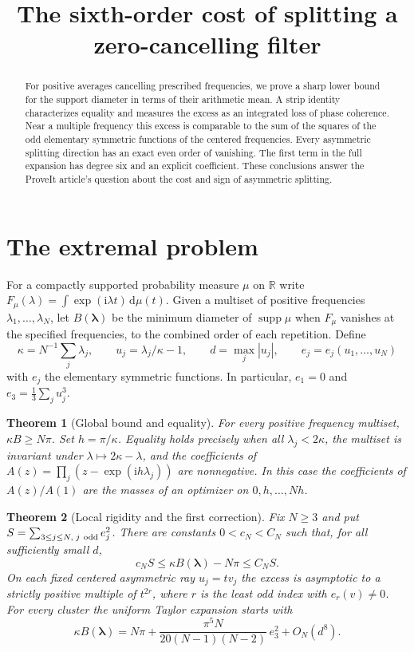 \documentclass[11pt]{article}
\title{The sixth-order cost of splitting a zero-cancelling filter}
\author{}
\date{}
\newtheorem{theorem}{Theorem}
\DeclareMathOperator{\supp}{supp}
\newcommand{\dd}{\mathrm d}
\newcommand{\ii}{\mathrm i}
\begin{document}
\maketitle
\begin{abstract}
For positive averages cancelling prescribed frequencies, we prove a sharp
lower bound for the support diameter in terms of their arithmetic mean.
A strip identity characterizes equality and measures the excess as an
integrated loss of phase coherence. Near a multiple frequency this excess
is comparable to the sum of the squares of the odd elementary symmetric
functions of the centered frequencies. Every asymmetric splitting direction
has an exact even order of vanishing. The first term in the full expansion
has degree six and an explicit coefficient. These conclusions answer the
ProveIt article's question about the cost and sign of asymmetric splitting.
\end{abstract}

\section{The extremal problem}
For a compactly supported probability measure $\mu$ on $\mathbb R$ write
$F_\mu(\lambda)=\int\exp(\ii\lambda t)\,\dd\mu(t)$.
Given a multiset of positive frequencies $\lambda_1,\dots,\lambda_N$, let
$B(\boldsymbol\lambda)$ be the minimum diameter of $\supp\mu$ when
$F_\mu$ vanishes at the specified frequencies, to the combined order of
each repetition. Define
\[
 \kappa=N^{-1}\sum_j\lambda_j,\qquad
 u_j=\lambda_j/\kappa-1,\qquad d=\max_j |u_j|,
 \qquad e_j=e_j(u_1,\dots,u_N)
\]
with $e_j$ the elementary symmetric functions. In particular,
$e_1=0$ and $e_3=\tfrac13\sum_j u_j^3$.

\begin{theorem}[Global bound and equality]\label{global}
For every positive frequency multiset, $\kappa B\ge N\pi$.
Set $h=\pi/\kappa$. Equality holds precisely when all
$\lambda_j<2\kappa$, the multiset is invariant under
$\lambda\mapsto2\kappa-\lambda$, and the coefficients of
$A(z)=\prod_j(z-\exp(\ii h\lambda_j))$ are nonnegative.
In this case the coefficients of $A(z)/A(1)$ are the masses of an optimizer
on $0,h,\ldots,Nh$.
\end{theorem}

\begin{theorem}[Local rigidity and the first correction]\label{main}
Fix $N\ge3$ and put $S=\sum_{3\le j\le N,\;j\ {\rm odd}} e_j^2$.
There are constants $0<c_N<C_N$ such that, for all sufficiently small $d$,
\[
 c_NS\le \kappa B(\boldsymbol\lambda)-N\pi\le C_NS .
\]
On each fixed centered asymmetric ray $u_j=tv_j$ the excess is asymptotic
to a strictly positive multiple of $t^{2r}$, where $r$ is the least odd index
with $e_r(v)\ne0$. For every cluster the uniform Taylor expansion starts with
\[
 \boxed{\displaystyle
 \kappa B(\boldsymbol\lambda)=N\pi+
 \frac{\pi^5 N}{20(N-1)(N-2)}\,e_3^2+O_N(d^8).}
\]
\end{theorem}
\end{document}
